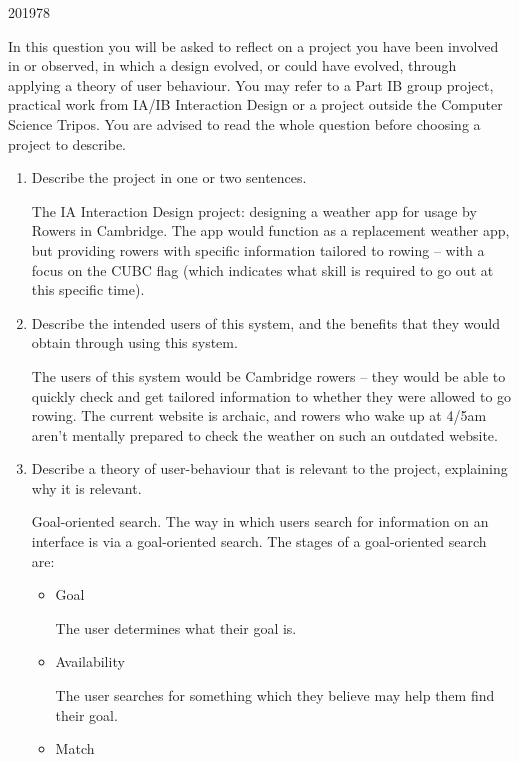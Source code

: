 \documentclass[10pt,\jkfside,a4paper]{article}
\begin{document}
\begin{examquestion}{2019}{7}{8}

In this question you will be asked to reflect on a project you have been
involved in or observed, in which a design evolved, or could have evolved,
through applying a theory of user behaviour. You may refer to a Part IB
group project, practical work from IA/IB Interaction Design or a project
outside the Computer Science Tripos. You are advised to read the whole
question before choosing a project to describe.

\begin{enumerate}

\item Describe the project in one or two sentences.

The IA Interaction Design project: designing a weather app for usage by
Rowers in Cambridge. The app would function as a replacement weather app,
but providing rowers with specific information tailored to rowing -- with a
focus on the CUBC flag (which indicates what skill is required to go out at
this specific time).

\item Describe the intended users of this system, and the benefits that they
would obtain through using this system.

The users of this system would be Cambridge rowers -- they would be able to
quickly check and get tailored information to whether they were allowed to
go rowing. The current website is archaic, and rowers who wake up at 4/5am
aren't mentally prepared to check the weather on such an outdated website.

\item Describe a theory of user-behaviour that is relevant to the project,
explaining why it is relevant.

Goal-oriented search. The way in which users search for information on an
interface is via a goal-oriented search. The stages of a goal-oriented
search are:

\begin{itemize}

\item Goal

The user determines what their goal is.

\item Availability

The user searches for something which they believe may help them find
their goal.

\item Match


\end{itemize}
\end{enumerate}
\end{examquestion}
\end{document}
